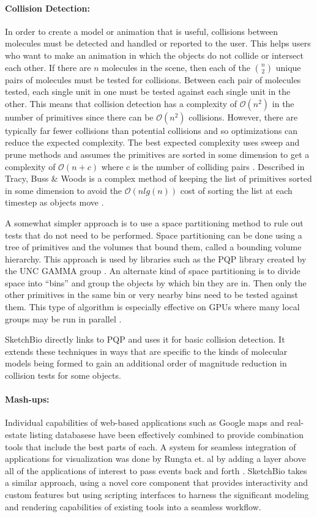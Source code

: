 \documentclass[twocolumn]{bmcart}%
\begin{document}
\paragraph*{Collision Detection:}
In order to create a model or animation that is useful, collisions between molecules must be detected and handled or reported to the user.
This helps users who want to make an animation in which the objects do not collide or intersect each other.
If there are $n$ molecules in the scene, then each of the $n\choose 2$ unique pairs of molecules must be tested for collisions.
Between each pair of molecules tested, each single unit in one must be tested against each single unit in the other.
This means that collision detection has a complexity of $\mathcal{O}(n^2)$ in the number of primitives since there can be $\mathcal{O}(n^2)$ collisions.
However, there are typically far fewer collisions than potential collisions and so optimizations can reduce the expected complexity.
The best expected complexity uses sweep and prune methods and assumes the primitives are sorted in some dimension to get a complexity of $\mathcal{O}(n + c)$ where c is the number of colliding pairs \cite{tracy2009efficient}.
Described in Tracy, Buss \& Woods is a complex method of keeping the list of primitives sorted in some dimension to avoid the $\mathcal{O}(n lg(n))$ cost of sorting the list at each timestep as objects move \cite{tracy2009efficient}.

A somewhat simpler approach is to use a space partitioning method to rule out tests that do not need to be performed.
Space partitioning can be done using a tree of primitives and the volumes that bound them, called a bounding volume hierarchy.
This approach is used by libraries such as the PQP library created by the UNC GAMMA group \cite{PQP}.
An alternate kind of space partitioning is to divide space into “bins” and group the objects by which bin they are in.
Then only the other primitives in the same bin or very nearby bins need to be tested against them.
This type of algorithm is especially effective on GPUs where many local groups may be run in parallel \cite{oat2008efficient}.

SketchBio directly links to PQP and uses it for basic collision detection.
It extends these techniques in ways that are specific to the kinds of molecular models being formed to gain an additional order of magnitude reduction in collision tests for some objects.

\paragraph*{Mash-ups:}
Individual capabilities of web-based applications such as Google maps and real-estate listing databasese have been effectively combined to provide combination tools that include the best parts of each.
A system for seamless integration of applications for visualization was done by Rungta et. al by adding a layer above all of the applications of interest to pass events back and forth \cite{rungta2013manyvis}.
SketchBio takes a similar approach, using a novel core component that provides interactivity and custom features but using scripting interfaces to harness the significant modeling and rendering capabilities of existing tools into a seamless workflow.
\end{document}
